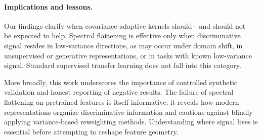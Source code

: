 \documentclass{article}
\begin{document}
\paragraph{Implications and lessons.}
Our findings clarify when covariance-adaptive kernels should—and should not—be expected to help. Spectral flattening is effective only when discriminative signal resides in low-variance directions, as may occur under domain shift, in unsupervised or generative representations, or in tasks with known low-variance signal. Standard supervised transfer learning does not fall into this category.

More broadly, this work underscores the importance of controlled synthetic validation and honest reporting of negative results. The failure of spectral flattening on pretrained features is itself informative: it reveals how modern representations organize discriminative information and cautions against blindly applying variance-based reweighting methods. Understanding where signal lives is essential before attempting to reshape feature geometry.



\end{document}
